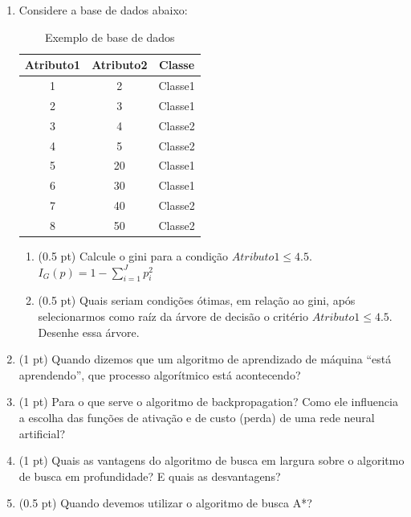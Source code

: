 \documentclass{article}
\begin{document}
\begin{enumerate}
\item Considere a base de dados abaixo:

\begin{table}[h!]
    \footnotesize
    \centering
    \begin{tabular}{|c|c|c|}
    \hline
    \textbf{Atributo1} & \textbf{Atributo2} & \textbf{Classe} \\
    \hline
    1 & 2 & Classe1 \\
    2 & 3 & Classe1 \\
    3 & 4 & Classe2 \\
    4 & 5 & Classe2 \\
    5 & 20 & Classe1 \\
    6 & 30 & Classe1 \\
    7 & 40 & Classe2 \\
    8 & 50 & Classe2 \\
    \hline
    \end{tabular}
    \caption{Exemplo de base de dados}
    \label{tab:exemplo}
\end{table}

\begin{enumerate}
    \item (0.5 pt) Calcule o gini para a condição $Atributo1 \leq 4.5$. $I_{G}(p) = 1 - \sum_{i=1}^{J} p_{i}^{2}$
    \item (0.5 pt) Quais seriam condições ótimas, em relação ao gini, após selecionarmos como raíz da árvore de decisão o critério $Atributo1 \leq 4.5$. Desenhe essa árvore.
\end{enumerate}

\item (1 pt) Quando dizemos que um algoritmo de aprendizado de máquina ``está aprendendo'', que processo algorítmico está acontecendo?

\item (1 pt) Para o que serve o algoritmo de backpropagation? Como ele influencia a escolha das funções de ativação e de custo (perda) de uma rede neural artificial?

\item (1 pt) Quais as vantagens do algoritmo de busca em largura sobre o algoritmo de busca em profundidade? E quais as desvantagens?

\item (0.5 pt)  Quando devemos utilizar o algoritmo de busca A*?

\end{enumerate}
\end{document}
